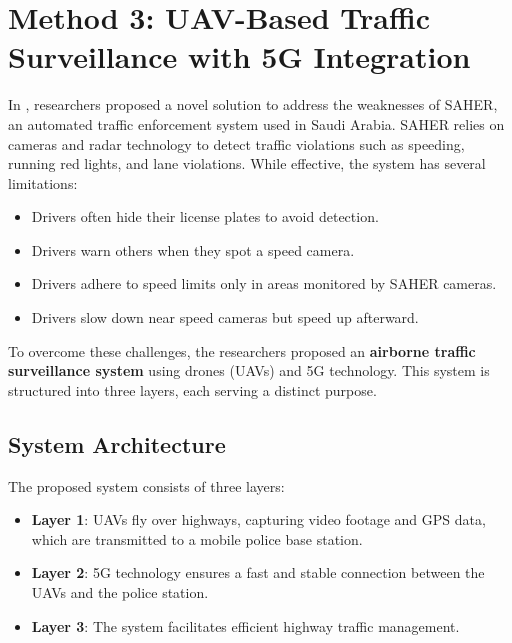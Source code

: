 

\section{Method 3: UAV-Based Traffic Surveillance with 5G Integration}
\label{sec:method3}

In \cite{khan2024smarttraffic}, researchers proposed a novel solution to address the weaknesses of SAHER, an automated traffic enforcement system used in Saudi Arabia. SAHER relies on cameras and radar technology to detect traffic violations such as speeding, running red lights, and lane violations. While effective, the system has several limitations:

\begin{itemize}
    \item Drivers often hide their license plates to avoid detection.
    \item Drivers warn others when they spot a speed camera.
    \item Drivers adhere to speed limits only in areas monitored by SAHER cameras.
    \item Drivers slow down near speed cameras but speed up afterward.
\end{itemize}

To overcome these challenges, the researchers proposed an \textbf{airborne traffic surveillance system} using drones (UAVs) and 5G technology. This system is structured into three layers, each serving a distinct purpose.

\vspace{\baselineskip} %

\subsection{System Architecture}
The proposed system consists of three layers:

\begin{itemize}
    \item \textbf{Layer 1}: UAVs fly over highways, capturing video footage and GPS data, which are transmitted to a mobile police base station.
    \item \textbf{Layer 2}: 5G technology ensures a fast and stable connection between the UAVs and the police station.
    \item \textbf{Layer 3}: The system facilitates efficient highway traffic management.
\end{itemize}

